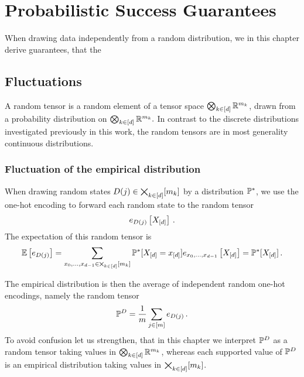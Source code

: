 \section{Probabilistic Success Guarantees}\label{cha:mlnConcentration}

When drawing data independently from a random distribution, we in this chapter derive guarantees, that the 

%
	
	
\subsection{Fluctuations}

A random tensor is a random element of a tensor space $\bigotimes_{k\in[d]} \mathbb{R}^{m_{k}}$, drawn from a probability distribution on $\bigotimes_{k\in[d]} \mathbb{R}^{m_{k}}.$
In contrast to the discrete distributions investigated previously in this work, the random tensors are in most generality continuous distributions. %

\subsubsection{Fluctuation of the empirical distribution}

When drawing random states $D(j)\in\bigtimes_{k\in[d]}[m_{k}]$ by a distribution $\mathbb{P}^*$, we use the one-hot encoding to forward each random state to the random tensor
	\[ e_{D(j)}\left[X_{[d]}\right] \, . \]
The expectation of this random tensor is
\begin{align*}
	\mathbb{E}\left[e_{D(j)}\right] 
	= \sum_{x_{0},\ldots,x_{d-1}\in\bigtimes_{k\in[d]}[m_{k}]} \mathbb{P}^*[X_{[d]}=x_{[d]}] e_{x_{0},\ldots,x_{d-1}}\left[X_{[d]}\right] 
	= \mathbb{P}^*[X_{[d]}] \, . 
\end{align*}
	
The empirical distribution is then the average of independent random one-hot encodings, namely the random tensor
	\[ \mathbb{P}^{D} = \frac{1}{m} \sum_{j\in[m]}  e_{D(j)} \, . \]
To avoid confusion let us strengthen, that in this chapter we interpret $\mathbb{P}^{D}$ as a random tensor taking values in $\bigotimes_{k\in[d]} \mathbb{R}^{m_{k}}$, whereas each supported value of $\mathbb{P}^{D}$ is an empirical distribution taking values in $\bigtimes_{k\in[d]}[m_{k}]$.


